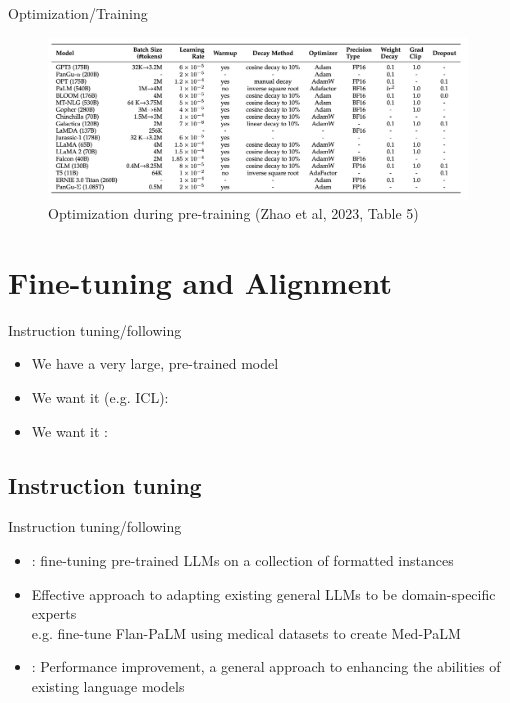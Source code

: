 \documentclass[10pt]{beamer}
\begin{document}
\begin{frame}{Optimization/Training}

\begin{figure}[h]
\centering
\includegraphics[width=0.99\textwidth]{fig/zhou_2023_tab5}
\caption{Optimization during pre-training (Zhao et al, 2023, Table 5)}
\end{figure}

\end{frame}




\section{Fine-tuning and Alignment}
\frame{\sectionpage}

\begin{frame}{Instruction tuning/following}

\begin{itemize}
\item We have a very large, pre-trained model
\item We want it  (e.g. ICL): 
\item We want it : 
\end{itemize}
\end{frame}


\subsection{Instruction tuning}

\begin{frame}{Instruction tuning/following}

\begin{itemize}
\item {}: fine-tuning pre-trained LLMs on a collection of formatted instances
\pause
\item Effective approach to adapting existing general LLMs to be domain-specific experts\\
e.g. fine-tune Flan-PaLM using medical datasets to create Med-PaLM
\pause
\item {}: Performance improvement, a general approach to enhancing the abilities of existing language models
\end{itemize}

\end{frame}
\end{document}

